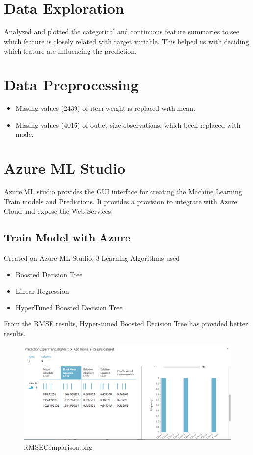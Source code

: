 \section{Data Exploration}
Analyzed and plotted the categorical and continuous feature summaries to 
see which feature is 
closely related with target variable. This helped us with deciding which 
feature are influencing 
the prediction.

\section{Data Preprocessing}
\begin{itemize}
\item Missing values (2439) of item weight is replaced with mean.
\item Missing values (4016) of outlet size observations, which been 
replaced with mode.
\end{itemize}


\section{Azure ML Studio}
Azure ML studio provides the GUI interface for creating the Machine 
Learning Train models and Predictions. It provides a provision to integrate 
with Azure Cloud and expose the Web Services

\subsection{Train Model with Azure}
Created on Azure ML Studio, 3 Learning Algorithms used
\begin{itemize}
\item Boosted Decision Tree
\item Linear Regression
\item HyperTuned Boosted Decision Tree
\end{itemize}

From the RMSE results, Hyper-tuned Boosted Decision Tree has provided better 
results.

\begin{figure}[pic3]
	\centering\includegraphics[width=\columnwidth]
{Images/mlstudio/RMSEComparison.png}
	\caption{RMSEComparison.png}\label{fig:RMSEComparison}
\end{figure}

